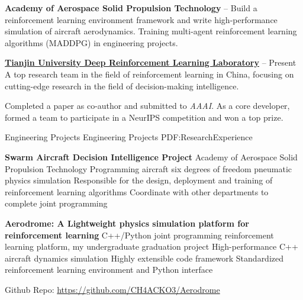 \documentclass[letterpaper,MMMyyyy,nonstopmode]{simpleresumecv}
\begin{document}
\begin{Body}
\BigGap
\textbf{Academy of Aerospace Solid Propulsion Technology}
\hfill
{} --
\newline
Build a reinforcement learning environment framework and write high-performance simulation of aircraft aerodynamics. Training multi-agent reinforcement learning algorithms (MADDPG) in engineering projects.

\BigGap
\href{http://rl.beiyang.ren/}{\textbf{Tianjin University Deep Reinforcement Learning Laboratory}}
\hfill
{} -- Present
\newline
A top research team in the field of reinforcement learning in China, focusing on cutting-edge research in the field of decision-making intelligence.
\begin{Detail}
\BulletItem
Completed a paper as co-author and submitted to \textit{AAAI}.
\BulletItem
As a core developer, formed a team to participate in a NeurIPS competition and won a top prize.
\end{Detail}


\clearpage
\Section
{Engineering Projects}
{Engineering Projects}
{PDF:ResearchExperience}

\Entry
\textbf{Swarm Aircraft Decision Intelligence Project}
\hfill
{}
\newline
Academy of Aerospace Solid Propulsion Technology
\BulletItem
Programming aircraft six degrees of freedom pneumatic physics simulation
\BulletItem
Responsible for the design, deployment and training of reinforcement learning algorithms
\BulletItem
Coordinate with other departments to complete joint programming

\BigGap
\Entry
\textbf{Aerodrome: A Lightweight physics simulation platform for reinforcement learning}
\hfill
{}
\newline
C++/Python joint programming reinforcement learning platform, my undergraduate graduation project
\BulletItem
High-performance C++ aircraft dynamics simulation
\SubBulletItem
Highly extensible code framework
\SubBulletItem
Standardized reinforcement learning environment and Python interface

Github Repo: \url{https://github.com/CH4ACKO3/Aerodrome}


\end{Body}
\end{document}
